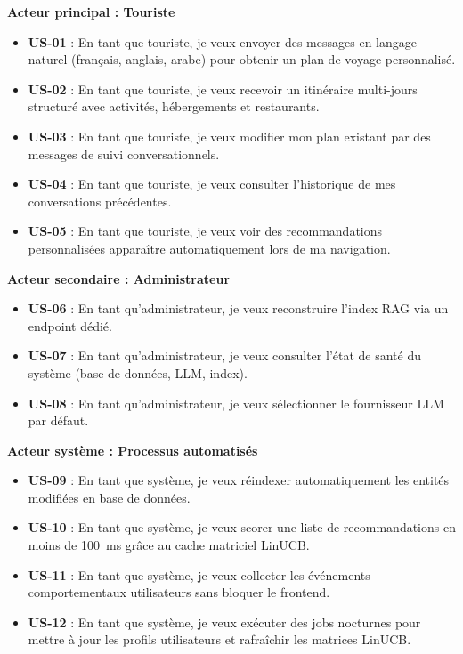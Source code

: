 \textbf{Acteur principal : Touriste}
\begin{itemize}
    \item \textbf{US-01} : En tant que touriste, je veux envoyer des messages en langage naturel (français, anglais, arabe) pour obtenir un plan de voyage personnalisé.
    \item \textbf{US-02} : En tant que touriste, je veux recevoir un itinéraire multi-jours structuré avec activités, hébergements et restaurants.
    \item \textbf{US-03} : En tant que touriste, je veux modifier mon plan existant par des messages de suivi conversationnels.
    \item \textbf{US-04} : En tant que touriste, je veux consulter l'historique de mes conversations précédentes.
    \item \textbf{US-05} : En tant que touriste, je veux voir des recommandations personnalisées apparaître automatiquement lors de ma navigation.
\end{itemize}

\textbf{Acteur secondaire : Administrateur}
\begin{itemize}
    \item \textbf{US-06} : En tant qu'administrateur, je veux reconstruire l'index RAG via un endpoint dédié.
    \item \textbf{US-07} : En tant qu'administrateur, je veux consulter l'état de santé du système (base de données, LLM, index).
    \item \textbf{US-08} : En tant qu'administrateur, je veux sélectionner le fournisseur LLM par défaut.
\end{itemize}

\textbf{Acteur système : Processus automatisés}
\begin{itemize}
    \item \textbf{US-09} : En tant que système, je veux réindexer automatiquement les entités modifiées en base de données.
    \item \textbf{US-10} : En tant que système, je veux scorer une liste de recommandations en moins de 100~ms grâce au cache matriciel LinUCB.
    \item \textbf{US-11} : En tant que système, je veux collecter les événements comportementaux utilisateurs sans bloquer le frontend.
    \item \textbf{US-12} : En tant que système, je veux exécuter des jobs nocturnes pour mettre à jour les profils utilisateurs et rafraîchir les matrices LinUCB.
\end{itemize}

